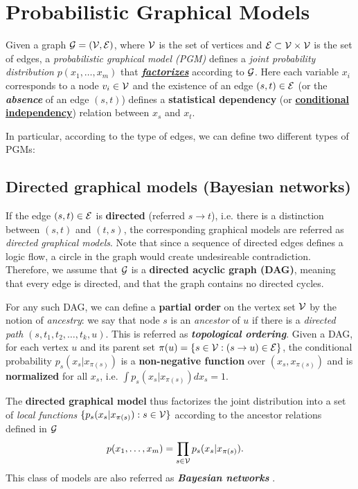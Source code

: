 \documentclass[11pt]{article}
\begin{document}
\section{Probabilistic Graphical Models}
Given a graph ${\mathcal G} = ({\mathcal V}, {\mathcal E})$, where ${\mathcal V}$ is the set of vertices and ${\mathcal E} \subset {\mathcal V} \times {\mathcal V}$ is the set of edges, a \emph{probabilistic graphical model (PGM)} defines a \emph{joint probability distribution} $p(x_1, \ldots, x_{m})$ that \underline{\emph{\textbf{factorizes}}} according to ${\mathcal G}$. Here each variable $x_i$ corresponds to a node $v_i \in {\mathcal V}$ and the existence of an edge $(s,t) \in {\mathcal E}$ (or the \emph{\textbf{absence}} of an edge $(s,t)$) defines a \textbf{statistical dependency} (or \underline{\textbf{conditional independency}}) relation between $x_s$ and $x_t$.  

In particular, according to the type of edges, we can define two different types of PGMs:

\subsection{Directed graphical models (Bayesian networks)} 
If the edge $(s, t) \in {\mathcal E}$ is \textbf{directed} (referred $s\rightarrow t$), i.e. there is a distinction between $(s, t)$ and $(t, s)$, the corresponding graphical models are referred as \emph{{directed graphical models}}.  Note that since a sequence of directed edges defines a logic flow, a circle in the graph would create undesireable contradiction. Therefore, we assume that ${\mathcal G}$ is a \textbf{directed acyclic graph (DAG)}, meaning
that every edge is directed, and that the graph contains no directed cycles. 

For any such DAG, we can define a \textbf{partial order} on the vertex set ${\mathcal V}$ by the notion of \emph{ancestry}:  we say that node $s$ is an \emph{ancestor} of $u$ if there is a \emph{directed path} $(s,t_1,t_2,\ldots,t_k,u)$. This is referred as \textbf{\emph{topological ordering}}. Given a DAG, for each vertex $u$ and its parent set $\pi(u) = \left\{s \in {\mathcal V}: (s\rightarrow u) \in {\mathcal E} \right\}$, the conditional probability $p_s(x_s | x_{\pi(s)})$ is a \textbf{non-negative function} over $ (x_s, x_{\pi(s)})$ and is \textbf{normalized} for all $x_s$, i.e. $\int p_s(x_s | x_{\pi(s)}) dx_s = 1.$

The \textbf{directed graphical model} thus factorizes the joint distribution into a set of \emph{local functions} $\{p_s(x_s | x_{\pi(s)}): s\in {\mathcal V}\}$ according to the ancestor relations defined in ${\mathcal G}$
\begin{align}
p(x_1, \ldots, x_{m}) &= \prod_{s \in {\mathcal V}}p_s(x_s | x_{\pi(s)}). \label{eqn: dag_graph_factorization}
\end{align} This class of models are also referred as \emph{\textbf{Bayesian networks}} \citep{koller2009probabilistic}.
\end{document}
